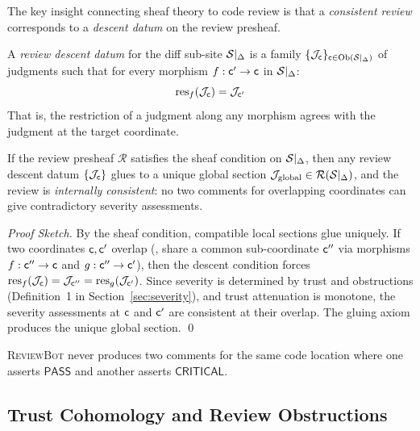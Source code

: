 \documentclass[11pt]{article}
\newcommand{\ReviewBot}{\textsc{ReviewBot}}
\newcommand{\ReviewJudg}{\mathcal{R}}
\newcommand{\SevCritical}{\mathsf{CRITICAL}}
\newcommand{\SevPass}{\mathsf{PASS}}
\begin{document}
The key insight connecting sheaf theory to code review is that a
\emph{consistent review} corresponds to a \emph{descent datum} on the
review presheaf.

\begin{definition}\label{def:review-descent}
A \emph{review descent datum} for the diff sub-site $\mathcal{S}|_\Delta$ is a
family $\{\mathcal{J}_{\mathsf{c}}\}_{\mathsf{c} \in \mathrm{Ob}(\mathcal{S}|_\Delta)}$ of judgments such
that for every morphism $f : \mathsf{c}' \to \mathsf{c}$ in $\mathcal{S}|_\Delta$:
\[
  \mathrm{res}_f(\mathcal{J}_{\mathsf{c}}) = \mathcal{J}_{\mathsf{c}'}
\]
That is, the restriction of a judgment along any morphism agrees with the
judgment at the target coordinate.
\end{definition}

\begin{theorem}\label{thm:review-descent}
If the review presheaf $\ReviewJudg$ satisfies the sheaf condition on
$\mathcal{S}|_\Delta$, then any review descent datum $\{\mathcal{J}_{\mathsf{c}}\}$ glues to a
unique global section $\J_{\mathrm{global}} \in \ReviewJudg(\Site|_\Delta)$,
and the review is \emph{internally consistent}: no two comments for
overlapping coordinates can give contradictory severity assessments.
\end{theorem}

\begin{proof}[Proof Sketch]
By the sheaf condition, compatible local sections glue uniquely. If two
coordinates $\mathsf{c}, \mathsf{c}'$ overlap (\ie{}, share a common sub-coordinate
$\mathsf{c}''$ via morphisms $f : \mathsf{c}'' \to \mathsf{c}$ and
$g : \mathsf{c}'' \to \mathsf{c}'$), then the descent condition forces
$\mathrm{res}_f(\mathcal{J}_{\mathsf{c}}) = \mathcal{J}_{\mathsf{c}''} = \mathrm{res}_g(\mathcal{J}_{\mathsf{c}'})$. Since
severity is determined by trust and obstructions (Definition~1 in
Section~\ref{sec:severity}), and trust attenuation is monotone, the
severity assessments at $\mathsf{c}$ and $\mathsf{c}'$ are consistent at their
overlap. The gluing axiom produces the unique global section. \qed
\end{proof}

\begin{corollary}\label{cor:no-contradiction}
\ReviewBot{} never produces two comments for the same code location where
one asserts $\SevPass$ and another asserts $\SevCritical$.
\end{corollary}

\subsection{Trust Cohomology and Review Obstructions}
\end{document}
